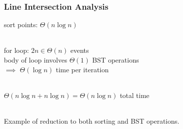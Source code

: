 \documentclass{beamer}
\newcommand{\stanza}{ \\~\ }
\begin{document}
\begin{frame} \frametitle{Line Intersection Analysis}
  sort points: $\Theta(n \log n)$ \stanza

  for loop: $2n \in \Theta(n)$ events \\
  body of loop involves $\Theta(1)$ BST operations \\
  $\implies$ $\Theta(\log n)$ time per iteration \stanza

  $\Theta(n \log n + n \log n) = \Theta(n \log n)$ total time \stanza

  Example of reduction to both sorting and BST operations.
\end{frame}
\end{document}

